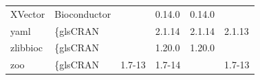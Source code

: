 \begin{longtable}{llllll}
\rowcolor{black!5}
XVector                       & Bioconductor              &             & 0.14.0      & 0.14.0         &                    \\
\rowcolor{black!10}
yaml                          & \{gls{CRAN}                      &             & 2.1.14      & 2.1.14         & 2.1.13            \\
\rowcolor{black!5}
zlibbioc                      & \{gls{CRAN}                      &             & 1.20.0      & 1.20.0         &                    \\
\rowcolor{black!10}
zoo                           & \{gls{CRAN}                      & 1.7-13      & 1.7-14      &                & 1.7-13            \\
\hline
\end{longtable}
